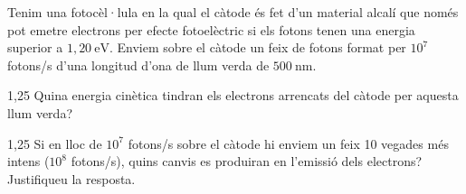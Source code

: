 Tenim una fotocèl·lula en la qual el càtode és fet d'un material alcalí que només pot emetre electrons per efecte fotoelèctric si els fotons tenen una energia superior a $1,20\ \mathrm{eV}$. Enviem sobre el càtode un feix de fotons format per $10^{7}$ fotons/s d'una longitud d'ona de llum verda de $500\ \mathrm{nm}$.

\begin{apartat}{1,25}
Quina energia cinètica tindran els electrons arrencats del càtode per aquesta llum verda?
\end{apartat}

\begin{apartat}{1,25}
Si en lloc de $10^{7}$ fotons/s sobre el càtode hi enviem un feix 10 vegades més intens ($10^{8}$ fotons/s), quins canvis es produiran en l'emissió dels electrons? Justifiqueu la resposta.
\end{apartat}

